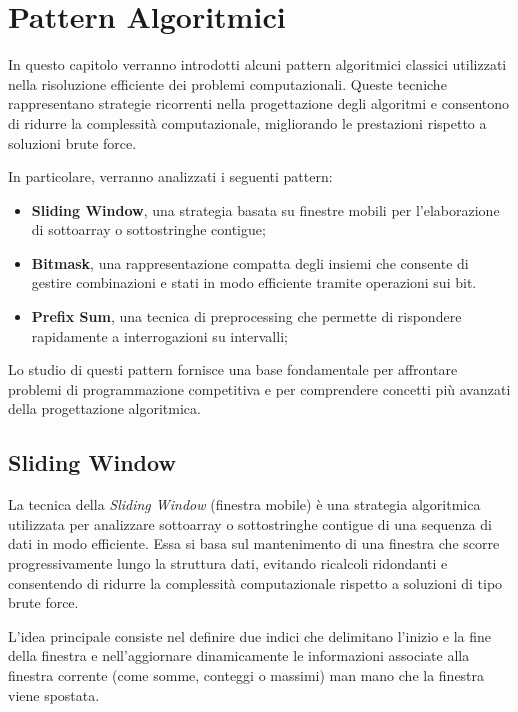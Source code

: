 
\chapter{Pattern Algoritmici}

In questo capitolo verranno introdotti alcuni pattern algoritmici classici utilizzati nella risoluzione efficiente dei problemi computazionali.  
Queste tecniche rappresentano strategie ricorrenti nella progettazione degli algoritmi e consentono di ridurre la complessità computazionale, migliorando le prestazioni rispetto a soluzioni brute force.

In particolare, verranno analizzati i seguenti pattern:
\begin{itemize}
	\item \textbf{Sliding Window}, una strategia basata su finestre mobili per l'elaborazione di sottoarray o sottostringhe contigue;
	\item \textbf{Bitmask}, una rappresentazione compatta degli insiemi che consente di gestire combinazioni e stati in modo efficiente tramite operazioni sui bit.
	\item \textbf{Prefix Sum}, una tecnica di preprocessing che permette di rispondere rapidamente a interrogazioni su intervalli;
\end{itemize}

Lo studio di questi pattern fornisce una base fondamentale per affrontare problemi di programmazione competitiva e per comprendere concetti più avanzati della progettazione algoritmica.





\section{Sliding Window}

La tecnica della \textit{Sliding Window} (finestra mobile) è una strategia algoritmica utilizzata per analizzare sottoarray o sottostringhe contigue di una sequenza di dati in modo efficiente.  
Essa si basa sul mantenimento di una finestra che scorre progressivamente lungo la struttura dati, evitando ricalcoli ridondanti e consentendo di ridurre la complessità computazionale rispetto a soluzioni di tipo brute force.

L’idea principale consiste nel definire due indici che delimitano l’inizio e la fine della finestra e nell’aggiornare dinamicamente le informazioni associate alla finestra corrente (come somme, conteggi o massimi) man mano che la finestra viene spostata.

